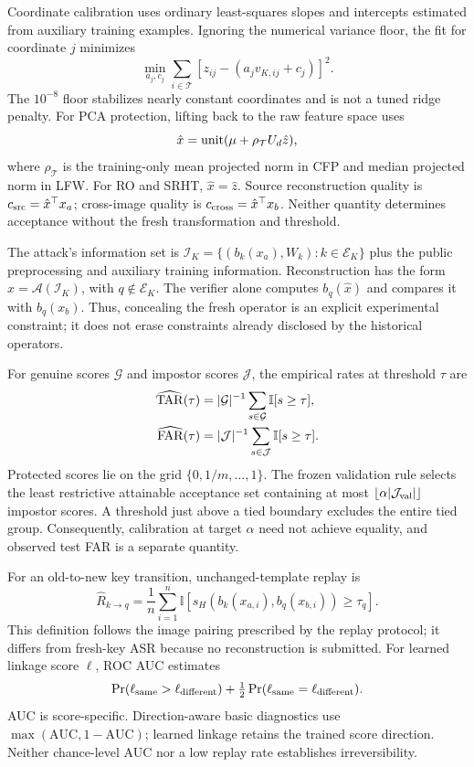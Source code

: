 Coordinate calibration uses ordinary least-squares slopes and intercepts estimated from auxiliary training examples. Ignoring the numerical variance floor, the fit for coordinate $j$ minimizes
\begin{equation}
 \min_{a_j,c_j}\sum_{i\in\mathcal T}
 \left[z_{ij}-(a_jv_{K,ij}+c_j)\right]^2.
\end{equation}
The $10^{-8}$ floor stabilizes nearly constant coordinates and is not a tuned ridge penalty. For PCA protection, lifting back to the raw feature space uses
\begin{equation}
 \hat x=\operatorname{unit}(\mu+\rho_{\mathcal T}U_d\hat z),
\label{eq:lift}
\end{equation}
where $\rho_{\mathcal T}$ is the training-only mean projected norm in CFP and median projected norm in LFW. For RO and SRHT, $\hat x=\hat z$. Source reconstruction quality is $c_{\rm src}=\hat x^\top x_a$; cross-image quality is $c_{\rm cross}=\hat x^\top x_b$. Neither quantity determines acceptance without the fresh transformation and threshold.

The attack's information set is $\mathcal I_K=\{(b_k(x_a),W_k):k\in\mathcal E_K\}$ plus the public preprocessing and auxiliary training information. Reconstruction has the form $\hat x=\mathcal A(\mathcal I_K)$, with $q\notin\mathcal E_K$. The verifier alone computes $b_q(\hat x)$ and compares it with $b_q(x_b)$. Thus, concealing the fresh operator is an explicit experimental constraint; it does not erase constraints already disclosed by the historical operators.


For genuine scores $\mathcal G$ and impostor scores $\mathcal J$, the empirical rates at threshold $\tau$ are
\begin{align}
 \widehat{\operatorname{TAR}}(\tau)&=|\mathcal G|^{-1}\sum_{s\in\mathcal G}\mathbb I[s\geq\tau],\\
 \widehat{\operatorname{FAR}}(\tau)&=|\mathcal J|^{-1}\sum_{s\in\mathcal J}\mathbb I[s\geq\tau].
\end{align}
Protected scores lie on the grid $\{0,1/m,\ldots,1\}$. The frozen validation rule selects the least restrictive attainable acceptance set containing at most $\lfloor\alpha|\mathcal J_{\rm val}|\rfloor$ impostor scores. A threshold just above a tied boundary excludes the entire tied group. Consequently, calibration at target $\alpha$ need not achieve equality, and observed test FAR is a separate quantity.

For an old-to-new key transition, unchanged-template replay is
\begin{equation}
 \widehat R_{k\to q}=\frac1n\sum_{i=1}^n
 \mathbb I[s_H(b_k(x_{a,i}),b_q(x_{b,i}))\geq\tau_q].
\end{equation}
This definition follows the image pairing prescribed by the replay protocol; it differs from fresh-key ASR because no reconstruction is submitted. For learned linkage score $\ell$, ROC AUC estimates
\begin{equation}
 \Pr(\ell_{\rm same}>\ell_{\rm different})+
 \tfrac12\Pr(\ell_{\rm same}=\ell_{\rm different}).
\end{equation}
AUC is score-specific. Direction-aware basic diagnostics use $\max(\mathrm{AUC},1-\mathrm{AUC})$; learned linkage retains the trained score direction. Neither chance-level AUC nor a low replay rate establishes irreversibility.
